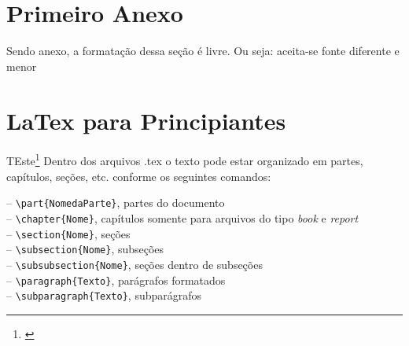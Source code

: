 \begin{anexosenv}

\partanexos



\chapter{Primeiro Anexo}

Sendo anexo, a formatação dessa seção é livre. Ou seja: aceita-se fonte diferente e menor


\chapter{LaTex para Principiantes}\label{anexo:latex}
TEste\footnote{\cite{Moro2012}}
Dentro dos arquivos .tex o texto pode estar organizado em partes, capítulos, seções, etc. conforme os seguintes comandos:

-- \verb|\part{NomedaParte}|, partes do documento \\
-- \verb|\chapter{Nome}|, capítulos somente para arquivos do tipo \textit{book} e \textit{report}\\
-- \verb|\section{Nome}|, seções\\
-- \verb|\subsection{Nome}|, subseções	\\
-- \verb|\subsubsection{Nome}|, seções dentro de subseções\\
-- \verb|\paragraph{Texto}|, parágrafos formatados	\\
-- \verb|\subparagraph{Texto}|, subparágrafos


\end{anexosenv}
